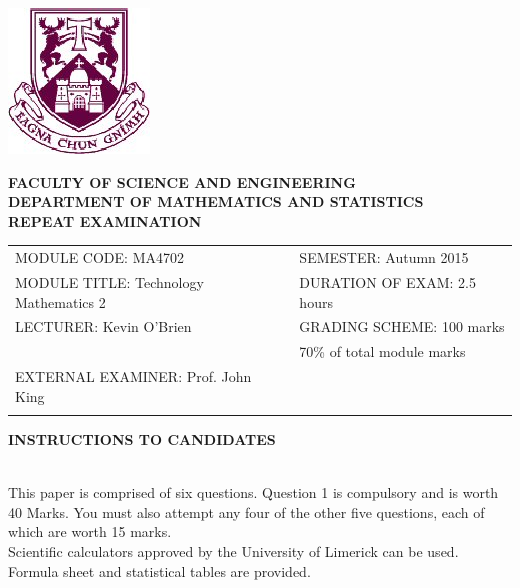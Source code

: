 \documentclass[a4paper,12pt]{article}
\begin{document}
\begin{center}
       \includegraphics[scale=0.60]{shieldtransparent2}
\end{center}

\begin{center}
\vspace{1cm}
\large \bf {FACULTY OF SCIENCE AND ENGINEERING} \\[0.5cm]
\normalsize DEPARTMENT OF MATHEMATICS AND STATISTICS \\[1.25cm]
\large \bf {REPEAT EXAMINATION} \\[1.5cm]
\end{center}

\begin{tabular}{ll}
MODULE CODE: MA4702 & SEMESTER: Autumn 2015\\[1cm]
MODULE TITLE: Technology Mathematics 2 & DURATION OF EXAM: 2.5 hours \\[1cm]
LECTURER: Kevin O'Brien & GRADING SCHEME: 100 marks\\
 & \phantom{GRADING SCHEME:} \footnotesize {70\% of total module marks}   \\[0.8cm]
EXTERNAL EXAMINER: Prof. John King & \\[1cm]
\\[1cm]
\end{tabular}
\begin{center}
{\bf INSTRUCTIONS TO CANDIDATES}
\end{center}

{\noindent \\ This paper is comprised of six questions. Question 1 is compulsory and is worth 40 Marks.  You must also attempt any four of the other five questions, each of which are worth 15 marks.
\\ Scientific calculators approved by the University of Limerick can be used. 
\\ Formula sheet and statistical tables are provided.
}
\normalsize
\newpage
\end{document}
